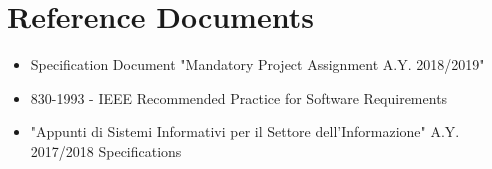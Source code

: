 \documentclass[12pt,a4paper]{article}
\begin{document}
	\section{Reference Documents}
	\begin{itemize}
		\item Specification Document "Mandatory Project Assignment A.Y. 2018/2019"
		\item 830-1993 - IEEE Recommended Practice for Software Requirements
		\item "Appunti di Sistemi Informativi per il Settore dell'Informazione" A.Y. 2017/2018
		 Specifications
	\end{itemize}
	
\end{document}
